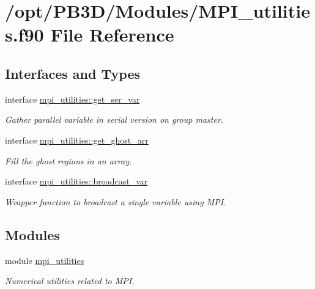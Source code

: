 \hypertarget{MPI__utilities_8f90}{}\section{/opt/\+P\+B3\+D/\+Modules/\+M\+P\+I\+\_\+utilities.f90 File Reference}
\label{MPI__utilities_8f90}
\subsection*{Interfaces and Types}
\begin{DoxyCompactItemize}
\item 
interface \hyperlink{interfacempi__utilities_1_1get__ser__var}{mpi\+\_\+utilities\+::get\+\_\+ser\+\_\+var}
\begin{DoxyCompactList}\small\item\em Gather parallel variable in serial version on group master. \end{DoxyCompactList}\item 
interface \hyperlink{interfacempi__utilities_1_1get__ghost__arr}{mpi\+\_\+utilities\+::get\+\_\+ghost\+\_\+arr}
\begin{DoxyCompactList}\small\item\em Fill the ghost regions in an array. \end{DoxyCompactList}\item 
interface \hyperlink{interfacempi__utilities_1_1broadcast__var}{mpi\+\_\+utilities\+::broadcast\+\_\+var}
\begin{DoxyCompactList}\small\item\em Wrapper function to broadcast a single variable using M\+PI. \end{DoxyCompactList}\end{DoxyCompactItemize}
\subsection*{Modules}
\begin{DoxyCompactItemize}
\item 
module \hyperlink{namespacempi__utilities}{mpi\+\_\+utilities}
\begin{DoxyCompactList}\small\item\em Numerical utilities related to M\+PI. \end{DoxyCompactList}\end{DoxyCompactItemize}
